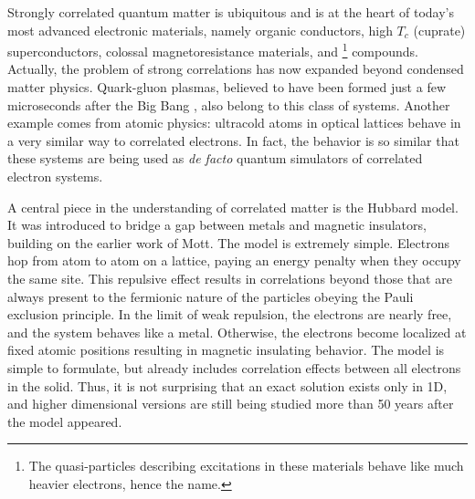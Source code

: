 Strongly correlated quantum matter is ubiquitous and is at the heart of today's most advanced electronic materials, namely organic conductors, high $T_c$ (cuprate) superconductors, colossal  magnetoresistance materials, and \footnote{The quasi-particles describing excitations in these materials behave like much heavier electrons, hence the name.} compounds. 
Actually, the problem of strong correlations has now expanded beyond condensed matter physics. Quark-gluon plasmas, believed to have been formed just a few microseconds after the Big Bang , also belong to this class of systems.
Another example comes from atomic physics: ultracold atoms in optical lattices behave in a very similar way to correlated electrons.
In fact, the behavior is so similar that these systems are being used as \emph{de facto} quantum simulators of correlated electron systems.

A central piece in the understanding of correlated matter is the Hubbard model.
It was introduced to bridge a gap between metals and magnetic insulators, building on the earlier work of Mott.
The model is extremely simple.
Electrons hop from atom to atom on a lattice, paying an energy penalty when they occupy the same site.
This repulsive effect results in correlations beyond those that are always present to the fermionic nature of the particles obeying the Pauli exclusion principle.
In the limit of weak repulsion, the electrons are nearly free, and the system behaves like a metal.
Otherwise, the electrons become localized at fixed atomic positions resulting in magnetic insulating behavior.
The model is simple to formulate, but already includes correlation effects between all electrons in the solid.
Thus, it is not surprising that an exact solution exists only in 1D, and higher dimensional versions are still being studied more than 50 years after the model appeared.